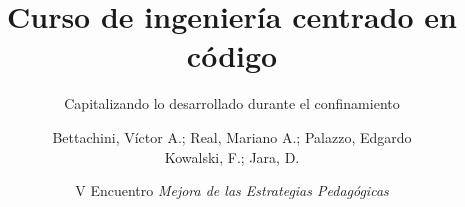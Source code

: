 \documentclass[aspectratio=43]{beamer}
\begin{document}
\title{Curso de ingeniería centrado en código}
\subtitle{Capitalizando lo desarrollado durante el confinamiento}
\author[vbettachini@unlam.edu.ar]{Bettachini, Víctor A.; Real, Mariano A.; Palazzo, Edgardo\\Kowalski, F.; Jara, D.}
\date[2023-09-22]{
	V Encuentro \emph{Mejora de las Estrategias Pedagógicas}%
}


\begin{frame} 
  \titlepage
\end{frame}

\end{document}
